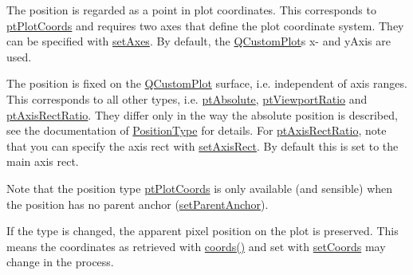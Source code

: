 \begin{DoxyItemize}
\item The position is regarded as a point in plot coordinates. This corresponds to \mbox{\hyperlink{class_q_c_p_item_position_aad9936c22bf43e3d358552f6e86dbdc8ad5ffb8dc99ad73263f7010c77342294c}{pt\+Plot\+Coords}} and requires two axes that define the plot coordinate system. They can be specified with \mbox{\hyperlink{class_q_c_p_item_position_a2185f45c75ac8cb9be89daeaaad50e37}{set\+Axes}}. By default, the \mbox{\hyperlink{class_q_custom_plot}{Q\+Custom\+Plot}}\textquotesingle{}s x-\/ and y\+Axis are used.\end{DoxyItemize}
\begin{DoxyItemize}
\item The position is fixed on the \mbox{\hyperlink{class_q_custom_plot}{Q\+Custom\+Plot}} surface, i.\+e. independent of axis ranges. This corresponds to all other types, i.\+e. \mbox{\hyperlink{class_q_c_p_item_position_aad9936c22bf43e3d358552f6e86dbdc8a564f5e53e550ead1ec5fc7fc7d0b73e0}{pt\+Absolute}}, \mbox{\hyperlink{class_q_c_p_item_position_aad9936c22bf43e3d358552f6e86dbdc8ac7d6aa89ceacb39658b0d6da061c789a}{pt\+Viewport\+Ratio}} and \mbox{\hyperlink{class_q_c_p_item_position_aad9936c22bf43e3d358552f6e86dbdc8a01080fd00eaf09fa238ef6b73bbfef75}{pt\+Axis\+Rect\+Ratio}}. They differ only in the way the absolute position is described, see the documentation of \mbox{\hyperlink{class_q_c_p_item_position_aad9936c22bf43e3d358552f6e86dbdc8}{Position\+Type}} for details. For \mbox{\hyperlink{class_q_c_p_item_position_aad9936c22bf43e3d358552f6e86dbdc8a01080fd00eaf09fa238ef6b73bbfef75}{pt\+Axis\+Rect\+Ratio}}, note that you can specify the axis rect with \mbox{\hyperlink{class_q_c_p_item_position_a0cd9b326fb324710169e92e8ca0041c2}{set\+Axis\+Rect}}. By default this is set to the main axis rect.\end{DoxyItemize}
Note that the position type \mbox{\hyperlink{class_q_c_p_item_position_aad9936c22bf43e3d358552f6e86dbdc8ad5ffb8dc99ad73263f7010c77342294c}{pt\+Plot\+Coords}} is only available (and sensible) when the position has no parent anchor (\mbox{\hyperlink{class_q_c_p_item_position_ac094d67a95d2dceafa0d50b9db3a7e51}{set\+Parent\+Anchor}}).

If the type is changed, the apparent pixel position on the plot is preserved. This means the coordinates as retrieved with \mbox{\hyperlink{class_q_c_p_item_position_aa4ecf5b04c67049c05d37619e090820b}{coords()}} and set with \mbox{\hyperlink{class_q_c_p_item_position_aa988ba4e87ab684c9021017dcaba945f}{set\+Coords}} may change in the process.

